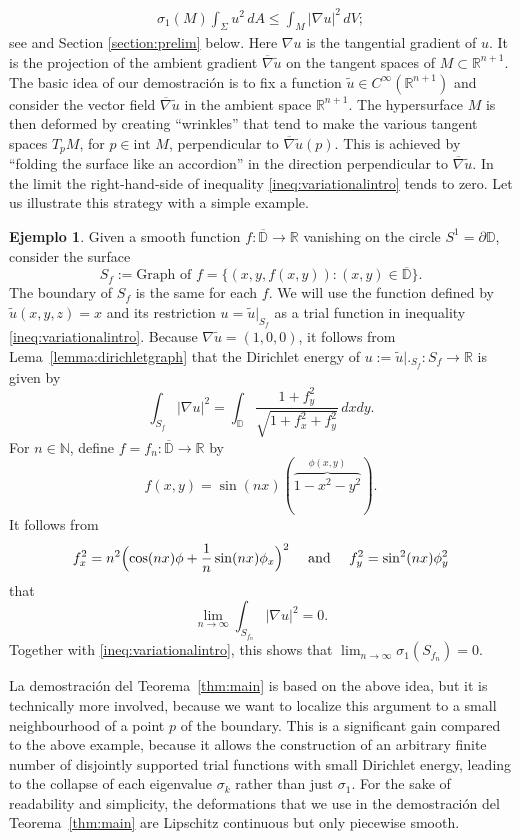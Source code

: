 \documentclass{GEM-JNL-FMP}
\theoremstyle{definition}
\newtheorem{example}[theorem]{Ejemplo}
\numberwithin{equation}{section}
\begin{document}
\begin{gather}\label{ineq:variationalintro}
\sigma_1(M)\int_{\Sigma}u^2\,dA\leq\int_M|\nabla u|^2\,dV;
\end{gather}
see \cite{GP17} and Section \ref{section:prelim} below. Here $\nabla u$ is the tangential gradient of $u$. It is the projection of the ambient gradient $\overline{\nabla}\widetilde{u}$ on the tangent spaces of $M\subset\mathbb{R}^{n+1}$. The basic idea of our demostración is to fix a function $\widetilde{u}\in C^\infty(\mathbb{R}^{n+1})$ and consider the vector field $\overline{\nabla}\widetilde{u}$ in the ambient space $\mathbb{R}^{n+1}$. The hypersurface $M$ is then deformed by creating ``wrinkles''  that tend to make the various tangent spaces $T_pM$, for $p\in\mbox{int }M$, perpendicular to $\overline{\nabla}\widetilde{u}(p)$. This is achieved by ``folding the surface like an accordion'' in the direction perpendicular to $\overline{\nabla}\widetilde{u}$. In the limit the right-hand-side of inequality \eqref{ineq:variationalintro} tends to zero.
Let us illustrate this strategy with a simple example.

\begin{example}
Given a smooth function $f\colon \overline{\mathbb{D}}\rightarrow\mathbb{R}$ vanishing on the circle $S^1=\partial\mathbb{D}$, consider the surface
$$
S_f:=\mbox{Graph of }f=
\big\{(x,y,f(x,y)) : (x,y)\in\overline{\mathbb{D}}\big\}.
$$
The boundary of $S_f$ is the same for each $f$.
We will use the function defined by $\widetilde{u}(x,y,z)=x$ and its restriction $u=\widetilde{u}|_{S_f}$ as a trial function in inequality \eqref{ineq:variationalintro}. Because $\nabla\widetilde{u}=(1,0,0)$, it follows from Lema~\ref{lemma:dirichletgraph} that the Dirichlet energy of $u:=\widetilde{u}
\bigl|\bigr._{{S_f}} \colon S_f\rightarrow\mathbb{R}$ is given by
$$\int_{S_f}|\nabla u|^2=\int_{\mathbb{D}} \frac{1 + f_y^2}{\sqrt{1 + f_x^2+f_y^2}}
\,dxdy.$$
For $n\in\mathbb{N}$, define $f=f_n\colon \overline{\mathbb{D}}\rightarrow\mathbb{R}$ by
$$f(x,y)=\sin(nx)(\overbrace{1-x^2-y^2}^{\phi(x,y)}).$$
It follows from
\begin{gather*}
f_x^2=n^2\Bigl(\cos(nx)\phi+\frac{1}{n}\sin(nx)\phi_x\Bigr)^2\quad\mbox{ and }\quad
f_y^2=\sin^2(nx)\phi_y^2
\end{gather*}
that
$$\lim_{n\to\infty}\int_{S_{f_n}}|\nabla u|^2=0.$$
Together with \eqref{ineq:variationalintro}, this shows that
$\lim_{n\to\infty}\sigma_1(S_{f_n})=0.$
\end{example}

La demostración del Teorema~\ref{thm:main} is based on the above idea, but it is technically more involved, because we want to localize this argument to a small neighbourhood of a point $p$ of the boundary. This is a significant gain compared to the above example, because it allows the construction of an arbitrary finite number of disjointly supported trial functions with small Dirichlet energy, leading to the collapse of each eigenvalue $\sigma_k$ rather than just $\sigma_1$.
For the sake of readability and simplicity, the deformations that we use in the demostración del Teorema~\ref{thm:main} are Lipschitz continuous but only piecewise smooth.
\end{document}
